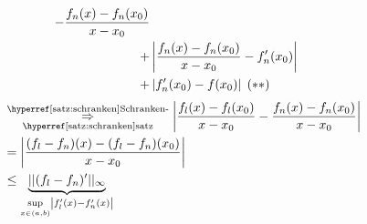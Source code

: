\documentclass[../ana1.tex]{subfiles}
\begin{document}
\begin{bew}
\begin{align*}
{        - \frac{f_n(x)-f_n(x_0)}{x-x_0} } \\
        + &\left| \frac{f_n(x)-f_n(x_0)}{x-x_0} 
        - f_n'(x_0) \right| \\
        + &\left| f_n'(x_0)
        - f(x_0) \right| \; (**)
    \end{align*}
    \begin{align*}
        &\overunderref{satz:schranken}{Schranken-}{satz}{\Rightarrow}
        \abs{\frac{f_l(x)-f_l(x_0)}{x-x_0}-\frac{f_n(x)-f_n(x_0)}{x-x_0}} \\
        &= \abs{\frac{(f_l-f_n)(x)-(f_l - f_n)(x_0)}{x-x_0}} \\
        &\leq \underbrace{||(f_l-f_n)'||_\infty}_
        {\underset{x \in (a,b)}{\sup} \abs{f_l'(x)-f_n'(x)}}
    \end{align*}
\end{bew}
\end{document}
